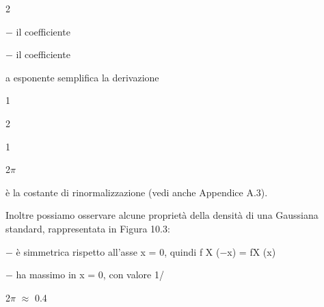 \documentclass[a4paper,portrait,12pt]{article}
\begin{document}
2





\begin{flushleft}
$-$ il coefficiente
\end{flushleft}


\begin{flushleft}
$-$ il coefficiente
\end{flushleft}





\begin{flushleft}
a esponente semplifica la derivazione
\end{flushleft}





1


2





1


\begin{flushleft}
2$\pi$
\end{flushleft}





\begin{flushleft}
\`{e} la costante di rinormalizzazione (vedi anche Appendice A.3).
\end{flushleft}





\begin{flushleft}
Inoltre possiamo osservare alcune propriet\`{a} della densit\`{a} di una Gaussiana standard, rappresentata in Figura 10.3:
\end{flushleft}


\begin{flushleft}
$-$ \`{e} simmetrica rispetto all'asse x = 0, quindi f X ($-$x) = fX (x)
\end{flushleft}


\begin{flushleft}
$-$ ha massimo in x = 0, con valore 1/
\end{flushleft}





\begin{flushleft}
2$\pi$ $\approx$ 0.4
\end{flushleft}
\end{document}
